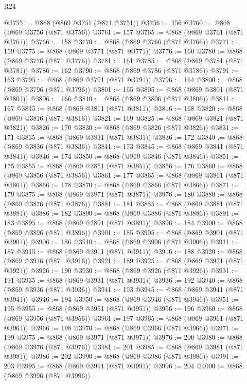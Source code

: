 \begin{lexlean}{R24}
\begin{coremodule}
{{{{{{{{{{{{{{{{{{{{{{{{{{{{{{{{{{{{{{{{{{{{{{{{{{{{{{{{{{{{{{{{{{{{{{{{{{{{{{{{{{{{{{{{{{{{{{{{{{{{{{{{{{{{{{{{{{{{{{{{{{{{{{{{{{{{{{{{{{{{{{{{{{{{{{{{{{{{{{{{{{{{{{{{{{{{{{{{{{{{{{{{{{{{{{{{{{{@3755 := @868 (@869 @3751 (@871 @3751))
@3756 := 156
@3760 := @868 (@869 @3756 (@871 @3756))
@3761 := 157
@3765 := @868 (@869 @3761 (@871 @3761))
@3766 := 158
@3770 := @868 (@869 @3766 (@871 @3766))
@3771 := 159
@3775 := @868 (@869 @3771 (@871 @3771))
@3776 := 160
@3780 := @868 (@869 @3776 (@871 @3776))
@3781 := 161
@3785 := @868 (@869 @3781 (@871 @3781))
@3786 := 162
@3790 := @868 (@869 @3786 (@871 @3786))
@3791 := 163
@3795 := @868 (@869 @3791 (@871 @3791))
@3796 := 164
@3800 := @868 (@869 @3796 (@871 @3796))
@3801 := 165
@3805 := @868 (@869 @3801 (@871 @3801))
@3806 := 166
@3810 := @868 (@869 @3806 (@871 @3806))
@3811 := 167
@3815 := @868 (@869 @3811 (@871 @3811))
@3816 := 168
@3820 := @868 (@869 @3816 (@871 @3816))
@3821 := 169
@3825 := @868 (@869 @3821 (@871 @3821))
@3826 := 170
@3830 := @868 (@869 @3826 (@871 @3826))
@3831 := 171
@3835 := @868 (@869 @3831 (@871 @3831))
@3836 := 172
@3840 := @868 (@869 @3836 (@871 @3836))
@3841 := 173
@3845 := @868 (@869 @3841 (@871 @3841))
@3846 := 174
@3850 := @868 (@869 @3846 (@871 @3846))
@3851 := 175
@3855 := @868 (@869 @3851 (@871 @3851))
@3856 := 176
@3860 := @868 (@869 @3856 (@871 @3856))
@3861 := 177
@3865 := @868 (@869 @3861 (@871 @3861))
@3866 := 178
@3870 := @868 (@869 @3866 (@871 @3866))
@3871 := 179
@3875 := @868 (@869 @3871 (@871 @3871))
@3876 := 180
@3880 := @868 (@869 @3876 (@871 @3876))
@3881 := 181
@3885 := @868 (@869 @3881 (@871 @3881))
@3886 := 182
@3890 := @868 (@869 @3886 (@871 @3886))
@3891 := 183
@3895 := @868 (@869 @3891 (@871 @3891))
@3896 := 184
@3900 := @868 (@869 @3896 (@871 @3896))
@3901 := 185
@3905 := @868 (@869 @3901 (@871 @3901))
@3906 := 186
@3910 := @868 (@869 @3906 (@871 @3906))
@3911 := 187
@3915 := @868 (@869 @3911 (@871 @3911))
@3916 := 188
@3920 := @868 (@869 @3916 (@871 @3916))
@3921 := 189
@3925 := @868 (@869 @3921 (@871 @3921))
@3926 := 190
@3930 := @868 (@869 @3926 (@871 @3926))
@3931 := 191
@3935 := @868 (@869 @3931 (@871 @3931))
@3936 := 192
@3940 := @868 (@869 @3936 (@871 @3936))
@3941 := 193
@3945 := @868 (@869 @3941 (@871 @3941))
@3946 := 194
@3950 := @868 (@869 @3946 (@871 @3946))
@3951 := 195
@3955 := @868 (@869 @3951 (@871 @3951))
@3956 := 196
@3960 := @868 (@869 @3956 (@871 @3956))
@3961 := 197
@3965 := @868 (@869 @3961 (@871 @3961))
@3966 := 198
@3970 := @868 (@869 @3966 (@871 @3966))
@3971 := 199
@3975 := @868 (@869 @3971 (@871 @3971))
@3976 := 200
@3980 := @868 (@869 @3976 (@871 @3976))
@3981 := 201
@3985 := @868 (@869 @3981 (@871 @3981))
@3986 := 202
@3990 := @868 (@869 @3986 (@871 @3986))
@3991 := 203
@3995 := @868 (@869 @3991 (@871 @3991))
@3996 := 204
@4000 := @868 (@869 @3996 (@871 @3996))
}}}}}}}}}}}}}}}}}}}}}}}}}}}}}}}}}}}}}}}}}}}}}}}}}}}}}}}}}}}}}}}}}}}}}}}}}}}}}}}}}}}}}}}}}}}}}}}}}}}}}}}}}}}}}}}}}}}}}}}}}}}}}}}}}}}}}}}}}}}}}}}}}}}}}}}}}}}}}}}}}}}}}}}}}}}}}}}}}}}}}}}}}}}}}}}}}}}
\end{coremodule}
\end{lexlean}
